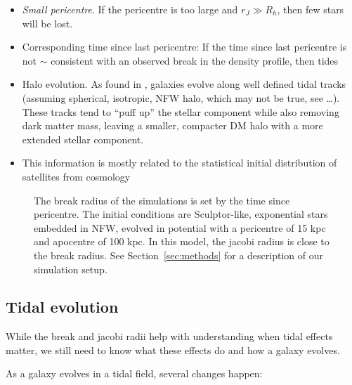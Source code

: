 \begin{itemize}
\tightlist
\item
  \emph{Small pericentre}. If the pericentre is too large and
  \(r_J \gg R_h\), then few stars will be lost.
\item
  Corresponding time since last pericentre: If the time since last
  pericentre is not \(\sim\) consistent with an observed break in the
  density profile, then tides
\item
  Halo evolution. As found in \citet{EN2021}, galaxies evolve along well
  defined tidal tracks (assuming spherical, isotropic, NFW halo, which
  may not be true, see \ldots). These tracks tend to ``puff up'' the
  stellar component while also removing dark matter mass, leaving a
  smaller, compacter DM halo with a more extended stellar component.
\item
  This information is mostly related to the statistical initial
  distribution of satellites from cosmology
  \citep{ludlow+2016, fattahi+2018}
\end{itemize}

\begin{figure}
\centering
{}
\caption[Break radius validation]{The break radius of the simulations is
set by the time since pericentre. The initial conditions are
Sculptor-like, exponential stars embedded in NFW, evolved in
\citet{EP2020} potential with a pericentre of 15 kpc and apocentre of
100 kpc. In this model, the jacobi radius is close to the break radius.
See Section~\ref{sec:methods} for a description of our simulation
setup.}\label{fig:idealized_break_radius}
\end{figure}

\subsection{Tidal evolution}\label{tidal-evolution}

While the break and jacobi radii help with understanding when tidal
effects matter, we still need to know what these effects do and how a
galaxy evolves.

As a galaxy evolves in a tidal field, several changes happen:

